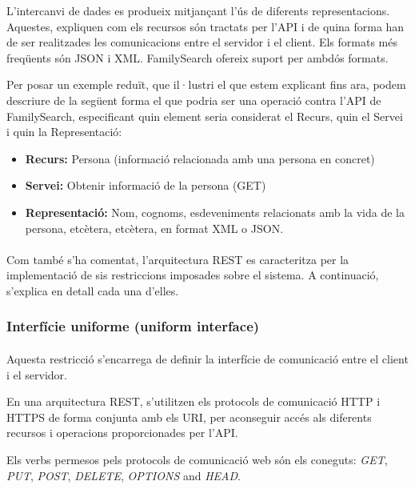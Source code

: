     L'intercanvi de dades es produeix mitjançant l'ús de diferents representacions. Aquestes, expliquen com els recursos són tractats per l’\gls{API} i de quina forma han de ser realitzades les comunicacions entre el servidor i el client. Els formats més freqüents són JSON i XML. FamilySearch ofereix suport per ambdós formats.

    Per posar un exemple reduït, que il·lustri el que estem explicant fins ara, podem descriure de la següent forma el que podria ser una operació contra l'\gls{API} de Family\-Search, especificant quin element seria considerat el Recurs, quin el Servei i quin la Representació:

    \begin{itemize}
        \item \textbf{Recurs:} Persona (informació relacionada amb una persona en concret)
        \item \textbf{Servei:} Obtenir informació de la persona (GET)
        \item \textbf{Representació:} Nom, cognoms, esdeveniments relacionats amb la vida de la persona, etcètera, etcètera, en format \gls{XML} o \gls{JSON}.
    \end{itemize}

    \paragraph{}
    Com també s'ha comentat, l’arquitectura \gls{REST} es caracteritza per la implementació de sis restriccions imposades sobre el sistema. A continuació, s'explica en detall cada una d'elles.


    \subsubsection{Interfície uniforme (uniform interface)}

    \paragraph{}
    Aquesta restricció s'encarrega de definir la interfície de comunicació entre el client i el servidor.

    En una arquitectura REST, s'utilitzen els protocols de comunicació \gls{HTTP} i \gls{HTTPS} de forma conjunta amb els \gls{URI}, per aconseguir accés als diferents recursos i operacions proporcionades per l'\gls{API}.

    Els verbs permesos pels protocols de comunicació web són els coneguts: \emph{GET}, \emph{PUT}, \emph{POST}, \emph{DELETE}, \emph{OPTIONS} and \emph{HEAD}.


